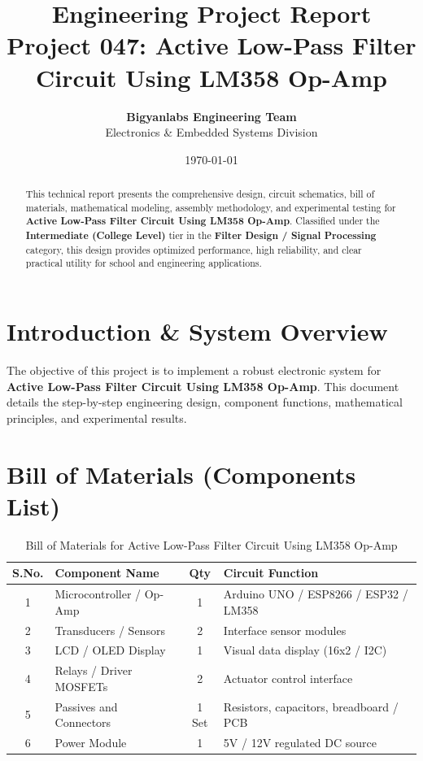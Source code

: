 \documentclass[11pt,a4paper]{article}
\title{\textbf{\Huge Engineering Project Report}\\[0.5em] \Large Project 047: Active Low-Pass Filter Circuit Using LM358 Op-Amp}
\author{\textbf{Bigyanlabs Engineering Team}\\ Electronics \& Embedded Systems Division}
\date{\today}
\begin{document}
\maketitle
\thispagestyle{empty}

\begin{abstract}
This technical report presents the comprehensive design, circuit schematics, bill of materials, mathematical modeling, assembly methodology, and experimental testing for \textbf{Active Low-Pass Filter Circuit Using LM358 Op-Amp}. Classified under the \textbf{Intermediate (College Level)} tier in the \textbf{Filter Design / Signal Processing} category, this design provides optimized performance, high reliability, and clear practical utility for school and engineering applications.
\end{abstract}

\newpage
\tableofcontents
\newpage

\section{Introduction \& System Overview}
The objective of this project is to implement a robust electronic system for \textbf{Active Low-Pass Filter Circuit Using LM358 Op-Amp}. This document details the step-by-step engineering design, component functions, mathematical principles, and experimental results.

\section{Bill of Materials (Components List)}
\begin{table}[h!]
\centering
\caption{Bill of Materials for Active Low-Pass Filter Circuit Using LM358 Op-Amp}
\vspace{0.5em}
\begin{tabular}{clcp{7cm}}
\toprule
\textbf{S.No.} & \textbf{Component Name} & \textbf{Qty} & \textbf{Circuit Function} \\
\midrule
1 & Microcontroller / Op-Amp & 1 & Arduino UNO / ESP8266 / ESP32 / LM358 \\
2 & Transducers / Sensors & 2 & Interface sensor modules \\
3 & LCD / OLED Display & 1 & Visual data display (16x2 / I2C) \\
4 & Relays / Driver MOSFETs & 2 & Actuator control interface \\
5 & Passives and Connectors & 1 Set & Resistors, capacitors, breadboard / PCB \\
6 & Power Module & 1 & 5V / 12V regulated DC source \\
\bottomrule
\end{tabular}
\end{table}
\end{document}
